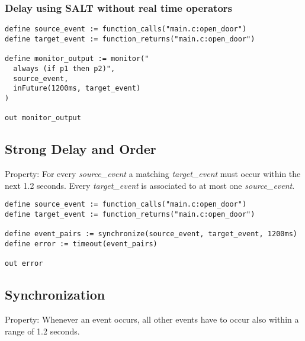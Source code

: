 %
%

\subsubsection{Delay using SALT without real time operators}

\begin{lstlisting}
define source_event := function_calls("main.c:open_door")
define target_event := function_returns("main.c:open_door")

define monitor_output := monitor("
  always (if p1 then p2)",
  source_event,
  inFuture(1200ms, target_event)
)

out monitor_output
\end{lstlisting}

\subsection{Strong Delay and Order}

Property: For every \emph{source\_event} a matching \emph{target\_event} must occur within the next 1.2 seconds.
Every \emph{target\_event} is associated to at most one \emph{source\_event}.

\begin{lstlisting}
define source_event := function_calls("main.c:open_door")
define target_event := function_returns("main.c:open_door")

define event_pairs := synchronize(source_event, target_event, 1200ms)
define error := timeout(event_pairs)

out error
\end{lstlisting}

\subsection{Synchronization}

Property: Whenever an event occurs, all other events have to occur also within a range of 1.2 seconds. 

